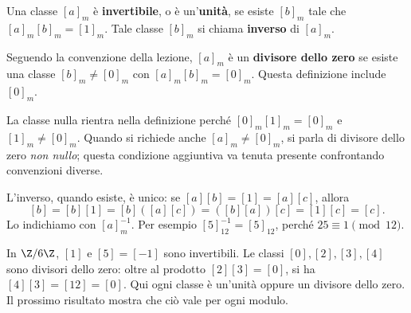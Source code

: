 \begin{definizione}
Una classe $[a]_m$ è \textbf{invertibile}, o è un'\textbf{unità}, se esiste $[b]_m$ tale che $[a]_m[b]_m=[1]_m$. Tale classe $[b]_m$ si chiama \textbf{inverso} di $[a]_m$.

Seguendo la convenzione della lezione, $[a]_m$ è un \textbf{divisore dello zero} se esiste una classe $[b]_m\ne[0]_m$ con $[a]_m[b]_m=[0]_m$. Questa definizione include $[0]_m$.
\end{definizione}

\begin{osservazione}
La classe nulla rientra nella definizione perché $[0]_m[1]_m=[0]_m$ e $[1]_m\ne[0]_m$. Quando si richiede anche $[a]_m\ne[0]_m$, si parla di divisore dello zero \emph{non nullo}; questa condizione aggiuntiva va tenuta presente confrontando convenzioni diverse.
\end{osservazione}

L'inverso, quando esiste, è unico: se $[a][b]=[1]=[a][c]$, allora
\[
[b]=[b][1]=[b]([a][c])=([b][a])[c]=[1][c]=[c].
\]
Lo indichiamo con $[a]_m^{-1}$. Per esempio $[5]_{12}^{-1}=[5]_{12}$, perché $25\equiv1\pmod{12}$.

\begin{esempio}
In $\Z/6\Z$, $[1]$ e $[5]=[-1]$ sono invertibili. Le classi $[0],[2],[3],[4]$ sono divisori dello zero: oltre al prodotto $[2][3]=[0]$, si ha $[4][3]=[12]=[0]$. Qui ogni classe è un'unità oppure un divisore dello zero. Il prossimo risultato mostra che ciò vale per ogni modulo.
\end{esempio}

